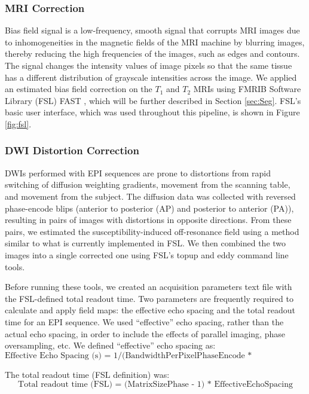 \subsubsection{MRI Correction}

Bias field signal is a low-frequency, smooth signal that corrupts MRI
images due to inhomogeneities in the magnetic fields of the MRI
machine by blurring images, thereby reducing the high frequencies of
the images, such as edges and contours. The signal changes the
intensity values of image pixels so that the same tissue has a
different distribution of grayscale intensities across the
image. \cite{ref:bias} We applied an estimated bias field correction
on the $T_1$ and $T_2$ MRIs using FMRIB Software Library (FSL) FAST
\cite{ref:fslfast}, which will be further described in Section
\ref{sec:Seg}. FSL's basic user interface, which was used throughout
this pipeline, is shown in Figure \ref{fig:fsl}.

\subsubsection{DWI Distortion Correction}

DWIs performed with EPI sequences are prone to distortions from rapid switching of diffusion weighting gradients, movement from the scanning table, and movement from the subject. The diffusion data was collected with reversed phase-encode blips (anterior to posterior (AP) and posterior to anterior (PA)), resulting in pairs of images with distortions in opposite directions. From these pairs, we estimated the susceptibility-induced off-resonance field using a method \cite{ref:fsltopup1} similar to what is currently implemented in FSL.\cite{ref:fsltopup2} We then combined the two images into a single corrected one using FSL's topup and eddy command line tools.

Before running these tools, we created an acquisition parameters text file with the FSL-defined total readout time. Two parameters are frequently required to calculate and apply field maps: the effective echo spacing and the total readout time for an EPI sequence.  We used ``effective'' echo spacing, rather than the actual echo spacing, in order to include the effects of parallel imaging, phase oversampling, etc. We defined ``effective'' echo spacing as:
\[
\text{Effective Echo Spacing (s) = 1/(BandwidthPerPixelPhaseEncode * MatrixSizePhase)}
\]

The total readout time (FSL definition) was:
\[
\text{Total readout time (FSL) = (MatrixSizePhase - 1) * EffectiveEchoSpacing}
\]

